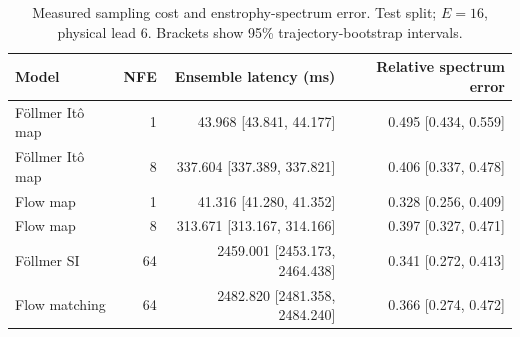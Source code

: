 \begin{table}[t]
\centering
\small
\setlength{\tabcolsep}{3pt}
\caption{Measured sampling cost and enstrophy-spectrum error. Test split; $E=16$, physical lead 6. Brackets show 95\% trajectory-bootstrap intervals.}
\label{tab:map-cost}
\begin{tabular}{lrrr}
\toprule
Model & NFE & Ensemble latency (ms) & Relative spectrum error \\
\midrule
Föllmer Itô map & 1 & 43.968 [43.841, 44.177] & 0.495 [0.434, 0.559] \\
Föllmer Itô map & 8 & 337.604 [337.389, 337.821] & 0.406 [0.337, 0.478] \\
\addlinespace
Flow map & 1 & 41.316 [41.280, 41.352] & 0.328 [0.256, 0.409] \\
Flow map & 8 & 313.671 [313.167, 314.166] & 0.397 [0.327, 0.471] \\
\addlinespace
Föllmer SI & 64 & 2459.001 [2453.173, 2464.438] & 0.341 [0.272, 0.413] \\
\addlinespace
Flow matching & 64 & 2482.820 [2481.358, 2484.240] & 0.366 [0.274, 0.472] \\
\bottomrule
\end{tabular}
\end{table}
